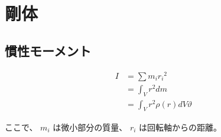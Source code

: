 \section{剛体}


\subsection{慣性モーメント}
\begin{align}
  I
    & = \sum m_i {r_i}^2 \\
    & = \int_{V} r^2 dm \\
    & = \int_{V} r^2 \rho \left( r \right) dV\vartheta
\end{align}

ここで、 $ m_i $ は微小部分の質量、 $ r_i $ は回転軸からの距離。
